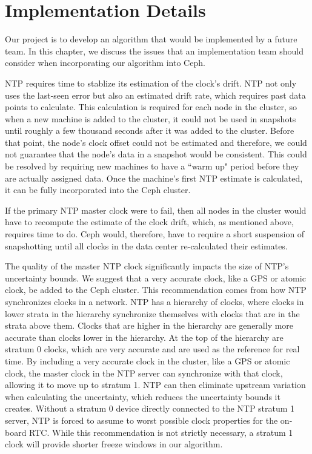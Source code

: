 \chapter{Implementation Details}
\label{sec:impl}

Our project is to develop an algorithm that would be implemented by a
future team. In this chapter, we discuss the issues that an
implementation team should consider when incorporating our algorithm
into Ceph.

NTP requires time to stablize its estimation of the clock's drift.
NTP not only uses the last-seen error but also an estimated drift
rate, which requires past data points to calculate. This calculation
is required for each node in the cluster, so when a new machine is
added to the cluster, it could not be used in snapshots until roughly
a few thousand seconds after it was added to the cluster. Before that
point, the node's clock offset could not be estimated and therefore,
we could not guarantee that the node's data in a snapshot would be
consistent. This could be resolved by requiring new machines to have a
``warm up" period before they are actually assigned data. Once the
machine's first NTP estimate is calculated, it can be fully
incorporated into the Ceph cluster.

If the primary NTP master clock were to fail, then all nodes in the
cluster would have to recompute the estimate of the clock drift,
which, as mentioned above, requires time to do. Ceph would, therefore,
have to require a short suspension of snapshotting until all clocks in
the data center re-calculated their estimates.

The quality of the master NTP clock significantly impacts the size of
NTP's uncertainty bounds. We suggest that a very accurate clock, like
a GPS or atomic clock, be added to the Ceph cluster. This
recommendation comes from how NTP synchronizes clocks in a
network. NTP has a hierarchy of clocks, where clocks in lower strata
in the hierarchy synchronize themselves with clocks that are in the
strata above them. Clocks that are higher in the hierarchy are
generally more accurate than clocks lower in the hierarchy. At the top
of the hierarchy are stratum 0 clocks, which are very accurate and are
used as the reference for real time. By including a very accurate
clock in the cluster, like a GPS or atomic clock, the master clock in
the NTP server can synchronize with that clock, allowing it to move up
to stratum 1. NTP can then eliminate upstream variation when
calculating the uncertainty, which reduces the uncertainty bounds it
creates. Without a stratum 0 device directly connected to the NTP
stratum 1 server, NTP is forced to assume to worst possible clock
properties for the on-board RTC. While this recommendation is not
strictly necessary, a stratum 1 clock will provide shorter freeze
windows in our algorithm.

